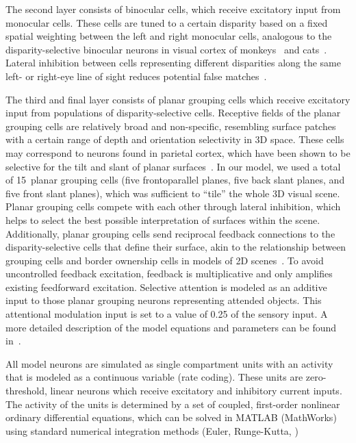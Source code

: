 The second layer consists of binocular cells, which receive excitatory
input from monocular cells. These cells are tuned to a certain disparity based on a fixed spatial weighting between the left and right monocular cells, analogous to the disparity-selective binocular neurons in visual cortex of monkeys~\citep{Poggio_Fischer77, Poggio_Poggio84} and cats~\citep{Bishop_Pettigrew86, Ohzawa_etal90}. Lateral inhibition between cells representing different disparities along the same left- or right-eye line of sight reduces potential false matches~\citep{Marr_Poggio76}.

The third and final layer consists of planar grouping cells which receive excitatory input from populations of disparity-selective
cells. Receptive fields of the planar grouping cells are relatively broad and non-specific, resembling surface patches with a certain range of depth and orientation selectivity in 3D space. These cells may correspond to neurons found in parietal cortex, which have been shown to be selective for the tilt and slant of planar surfaces~\citep{Rosenberg_etal13}. In our model, we used a total of 15~planar grouping cells (\ie five frontoparallel planes, five back slant planes, and five front slant planes), which was sufficient to ``tile'' the whole 3D visual scene. Planar grouping cells compete with each other through lateral inhibition, which helps to select the best possible interpretation of surfaces within the scene. Additionally, planar grouping cells send reciprocal feedback connections to the disparity-selective cells that define their surface, akin to the relationship between grouping cells and border ownership cells in models of 2D scenes~\citep{Craft_etal07,Mihalas_etal11b}. To avoid
uncontrolled feedback excitation, feedback is multiplicative and only amplifies existing feedforward excitation. Selective attention is modeled as an additive input to those planar grouping neurons representing attended objects. This attentional modulation input is set to a value of 0.25 of the sensory input. A more detailed description of the model equations and parameters can be found in~.

All model neurons are simulated as single compartment units with an
activity that is modeled as a continuous variable (rate coding). These
units are zero-threshold, linear neurons which receive excitatory and
inhibitory current inputs. The activity of the units is determined by
a set of coupled, first-order nonlinear ordinary differential equations, which can be solved in MATLAB (MathWorks) using standard numerical integration methods (Euler, Runge-Kutta, \etc) 

